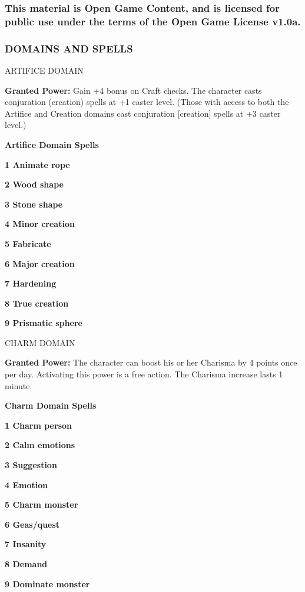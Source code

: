 \documentclass{article}
\begin{document}
\subsubsection*{This material is Open Game Content, and is licensed for public 
use under the terms of the Open Game License v1.0a.}

\subsubsection*{{\LARGE{}DOMAINS AND SPELLS}}

\vspace{12pt}
ARTIFICE DOMAIN

\textbf{Granted Power:} Gain +4 bonus on Craft checks. The character casts conjuration 
(creation) spells at +1 caster level. (Those with access to both the Artifice and 
Creation domains cast conjuration [creation] spells at +3 caster level.)

\textbf{Artifice Domain Spells}

\textbf{1 Animate rope}

\textbf{2 Wood shape}

\textbf{3 Stone shape}

\textbf{4 Minor creation}

\textbf{5 Fabricate}

\textbf{6 Major creation}

\textbf{7 Hardening}

\textbf{8 True creation}

\textbf{9 Prismatic sphere}

\vspace{12pt}
CHARM DOMAIN

\textbf{Granted Power:} The character can boost his or her Charisma by 4 points 
once per day. Activating this power is a free action. The Charisma increase lasts 
1 minute.

\textbf{Charm Domain Spells}

\textbf{1 Charm person}

\textbf{2 Calm emotions}

\textbf{3 Suggestion}

\textbf{4 Emotion}

\textbf{5 Charm monster}

\textbf{6 Geas/quest}

\textbf{7 Insanity}

\textbf{8 Demand}

\textbf{9 Dominate monster}
\end{document}
